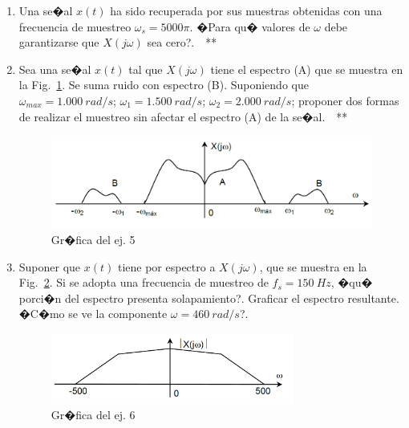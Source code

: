 \documentclass[10pt,a4paper]{article}
\begin{document}
\begin{enumerate}
\item {Una se�al $x(t)$ ha sido recuperada por sus muestras obtenidas con una frecuencia de muestreo 
$\omega_s=5000\pi$. �Para qu� valores de $\omega$ debe garantizarse que $X(j\omega)$ sea cero?}.~~**

\item {Sea una se�al $x(t)$ tal que $X(j\omega)$ tiene el espectro (A) que se muestra en la Fig.~\ref{fig:ej_5}. Se 
suma ruido con espectro (B). Suponiendo que 	$\omega_{max}=1.000~rad/s$; $\omega_{1}=1.500~rad/s$; 
$\omega_{2}=2.000~rad/s$; proponer dos formas de realizar el muestreo sin afectar el espectro (A) de la se�al.}~~**

\begin{figure}[h]
	\begin{center}
		\includegraphics[width=12cm]{tp8_ej5.png}
	\end{center}
	\caption{Gr�fica del ej. 5}
	\label{fig:ej_5}
\end{figure}

\item {Suponer que $x(t)$ tiene por espectro a $X(j\omega)$, que se muestra en la Fig.~\ref{fig:ej_6}. Si se adopta una 
frecuencia de muestreo de $f_s=150~Hz$, �qu� porci�n del espectro presenta solapamiento?. Graficar el espectro 
resultante. �C�mo se ve la componente $\omega=460~rad/s$?}.

\begin{figure}[h]
	\begin{center}
		\includegraphics[width=8cm]{tp8_ej6.png}
	\end{center}
	\caption{Gr�fica del ej. 6}
	\label{fig:ej_6}
\end{figure}


\end{enumerate}
\end{document}
